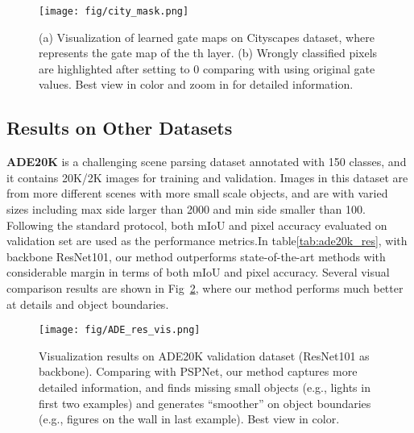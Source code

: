 \documentclass[letterpaper]{article} \usepackage{aaai20}  \usepackage{times}  \usepackage{helvet} \usepackage{courier}  \usepackage[hyphens]{url}  \usepackage{graphicx} \urlstyle{rm} \def\UrlFont{\rm}  \usepackage{graphicx}  \usepackage{amsmath}
\begin{document}
\begin{figure}
\centering
\texttt{[image: fig/city\_mask.png]}
\caption{
(a) Visualization of learned gate maps on Cityscapes dataset, where  represents the gate map of the th layer. (b) Wrongly classified pixels are highlighted after setting  to 0 comparing with using original gate values.
Best view in color and zoom in for detailed information.}
\label{fig:city_mask_vis}
\end{figure}


\subsection{Results on Other Datasets}
\textbf{ADE20K} is a challenging scene parsing dataset annotated with 150 classes, and it contains 20K/2K images for training and validation. Images in this dataset are from more different scenes with more small scale objects, and are with varied sizes including max side larger than 2000 and min side smaller than 100. Following the standard protocol, both mIoU and pixel accuracy evaluated on validation set are used as the performance metrics.In table\ref{tab:ade20k_res}, with backbone ResNet101, our method outperforms state-of-the-art methods with considerable margin in terms of both mIoU and pixel accuracy. Several visual comparison results are shown in Fig~\ref{fig:ade_vis_res}, where our method performs much better at details and object boundaries.

\begin{figure}
\centering
\texttt{[image: fig/ADE\_res\_vis.png]}
\caption{Visualization results on ADE20K validation dataset (ResNet101 as backbone). Comparing with PSPNet, our method captures more detailed information, and finds missing small objects (e.g., lights in first two examples) and generates ``smoother'' on object boundaries (e.g., figures on the wall in last example). Best view in color.}
\label{fig:ade_vis_res}
\end{figure}    
\end{document}
